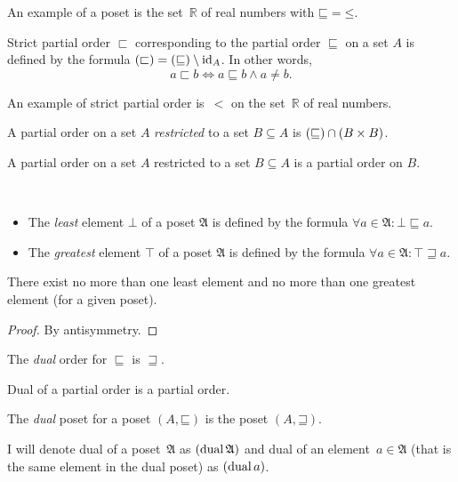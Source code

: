 An example of a poset is the set~$\mathbb{R}$ of real numbers with $\mathord{\sqsubseteq} = \mathord{\leq}$.

\begin{defn}
Strict partial order $\sqsubset$ corresponding
to the partial order $\sqsubseteq$ on a set $A$ is defined by the
formula $\left(\mathord{\sqsubset}\right)=\left(\mathord{\sqsubseteq}\right)\setminus\operatorname{id}_{A}$.
In other words, \[ a\sqsubset b\Leftrightarrow a\sqsubseteq b\land a\ne b. \]
\end{defn}

An example of strict partial order is~$<$ on the set~$\mathbb{R}$ of real numbers.

\begin{defn}
A partial order on a set $A$ \emph{restricted}
to a set $B\subseteq A$ is $\left(\mathord{\sqsubseteq}\right)\cap(B\times B)$.\end{defn}
\begin{obvious}
A partial order on a set $A$ restricted to a set $B\subseteq A$
is a partial order on $B$.\end{obvious}
\begin{defn}
~
\begin{itemize}
\item {}The \emph{least} element $\bot$ of a poset
$\mathfrak{A}$ is defined by the formula $\forall a\in\mathfrak{A}:\bot\sqsubseteq a$.
\item {}The \emph{greatest} element $\top$ of a
poset $\mathfrak{A}$ is defined by the formula $\forall a\in\mathfrak{A}:\top\sqsupseteq a$.
\end{itemize}
\end{defn}
\begin{prop}
There exist no more than one least element and no more than one greatest
element (for a given poset).\end{prop}
\begin{proof}
By antisymmetry.\end{proof}
\begin{defn}
The \emph{dual} order for $\sqsubseteq$ is $\sqsupseteq$.\end{defn}
\begin{obvious}
Dual of a partial order is a partial order.\end{obvious}
\begin{defn}
The \emph{dual} poset for a poset $(A,\mathord{\sqsubseteq})$
is the poset $(A,\mathord{\sqsupseteq})$.
\end{defn}
I will denote dual of a poset~$\mathfrak{A}$ as $(\operatorname{dual}\mathfrak{A})$
and dual of an element~$a\in\mathfrak{A}$ (that is the same element
in the dual poset) as $(\operatorname{dual} a)$.

